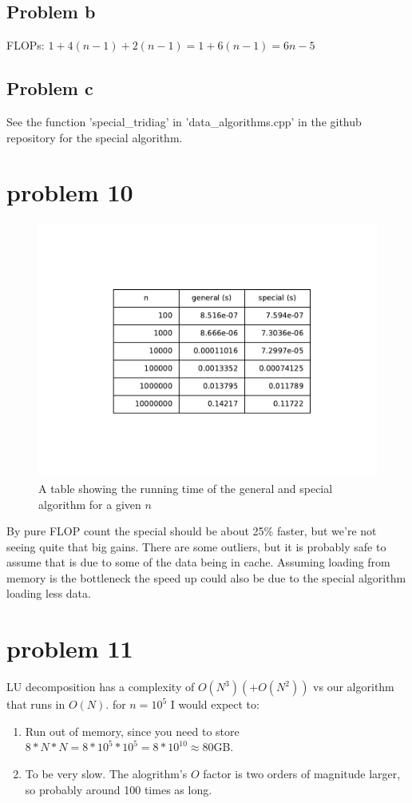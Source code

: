 \documentclass[english,notitlepage]{revtex4-1}  %
\begin{document}
	\subsection*{Problem b}
		FLOPs: $1 + 4(n-1) + 2(n-1) = 1 + 6(n-1) = 6n - 5$
	\subsection*{Problem c}
	See the function 'special\_tridiag' in 'data\_algorithms.cpp' in the github repository for the special algorithm.



\section*{problem 10}
	\begin{figure}[H]
		\centering
		\includegraphics[scale=0.75]{plots/cmp_gen_spec.pdf} %
		\caption{A table showing the running time of the general and special algorithm for a given $n$}
		\label{fig:cmp_gen_spec}
	\end{figure}
By pure FLOP count the special should be about 25\% faster, but we're not seeing quite that big gains. There are some outliers, but it is probably safe to assume that is due to some of the data being in cache. Assuming loading from memory is the bottleneck the speed up could also be due to the special algorithm loading less data.

\section*{problem 11}
LU decomposition has a complexity of $O(N^3) (+O(N^2))$ vs our algorithm that runs in $O(N)$. for $n=10^5$ I would expect to: \\
\begin{enumerate}
	\item Run out of memory, since you need to store $8*N*N = 8*10^5*10^5 = 8*10^{10} \approx 80$GB.
	\item To be very slow. The alogrithm's $O$ factor is two orders of magnitude larger, so probably around 100 times as long.
\end{enumerate}
\end{document}
